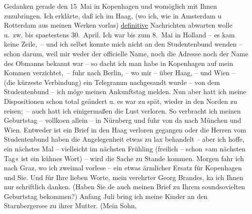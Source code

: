 \begin{ledgroupsized}[t]{13cm}
               Gedanken gerade den 15 Mai in Kopenhagen und womöglich mit Ihnen zuzubringen. Ich erklärte, daß ich im Haag, (wo ich, wie in Amsterdam u Rotterdam aus
               meinen Werken vorlas) \uline{definitive}{ } Nachrichten abwarten wolle u. zw. bis spaetestens
                  30. April. Ich war bis zum 8. Mai in Holland – es kam keine Zeile, – und ich selbst konnte mich nicht
               an den Studentenbund wenden – schon darum, weil mir weder der officielle Name, noch
               die Adresse noch der Name des Obmanns {\pb}bekannt war
               – so dacht ich man habe in Kopenhagen auf mein
               Kommen verzichtet, – fuhr nach Berlin, – wo mir –
               über Haag, – und Wien – (die kürzeste Verbindung) ein Telegramm nachgesandt wurde – von dem
               Studentenbund – ich möge meinen Ankunftstag melden. Nun aber hatt ich meine
               Dispositionen schon total geändert u. es war zu spät, wieder in den Norden zu
               reisen; – auch hatt ich einigermaßen die Lust verloren. So verbracht ich meinen
               Geburtstag – vollko{\geminationm}en allein – in Nürnberg und fuhr von da nach München und Wien. Entweder ist ein Brief
               in den Haag verloren gegangen oder die Herren
               vom Studentenbund haben die Angelegenheit etwas zu lax behandelt – aber ich hoffe,
               ein nächstes Mal – vielleicht im nächsten Frühling (freilich – schon »am nächsten
               Tag« ist ein kühnes Wort) – wird die Sache zu Stande kommen. {\pb}Morgen fahr ich nach Graz, wo ich zweimal vorlese – ein etwas ärmlicher Ersatz für
                  Kopenhagen und Sie.\pend
           \pstart
           Und für Ihre lieben Worte, mein verehrter Georg Brandes, ka{\geminationn} ich Ihnen nur schriftlich danken. (Haben Sie de{\geminationn} auch meinen Brief zu Ihrem soundsovielten Geburtstag
               bekommen?)\pend
           \pstart
           Anfang Juli bring ich meine Kinder an den Starnbergersee zu ihrer Mutter. (Mein Sohn,

\end{ledgroupsized}
